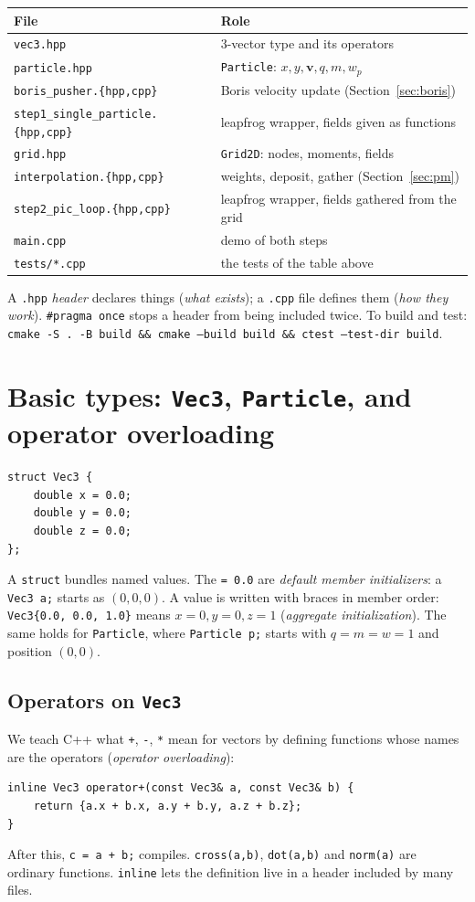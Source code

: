 \documentclass[11pt,a4paper]{article}
\newcommand{\vv}{\mathbf{v}}
\begin{document}
\begin{center}
\begin{tabular}{ll}
\toprule
File & Role \\
\midrule
\texttt{vec3.hpp} & 3-vector type and its operators\\
\texttt{particle.hpp} & \texttt{Particle}: $x,y,\vv,q,m,w_p$\\
\texttt{boris\_pusher.\{hpp,cpp\}} & Boris velocity update (Section~\ref{sec:boris})\\
\texttt{step1\_single\_particle.\{hpp,cpp\}} & leapfrog wrapper, fields given as functions\\
\texttt{grid.hpp} & \texttt{Grid2D}: nodes, moments, fields\\
\texttt{interpolation.\{hpp,cpp\}} & weights, deposit, gather (Section~\ref{sec:pm})\\
\texttt{step2\_pic\_loop.\{hpp,cpp\}} & leapfrog wrapper, fields gathered from the grid\\
\texttt{main.cpp} & demo of both steps\\
\texttt{tests/*.cpp} & the tests of the table above\\
\bottomrule
\end{tabular}
\end{center}
A \texttt{.hpp} \emph{header} declares things (\emph{what exists}); a \texttt{.cpp} file defines them
(\emph{how they work}). \lstinline|#pragma once| stops a header from being included twice.
To build and test: \texttt{cmake -S . -B build \&\& cmake --build build \&\& ctest --test-dir build}.

\section{Basic types: \texttt{Vec3}, \texttt{Particle}, and operator overloading}

\begin{lstlisting}
struct Vec3 {
    double x = 0.0;
    double y = 0.0;
    double z = 0.0;
};
\end{lstlisting}
A \texttt{struct} bundles named values. The \texttt{= 0.0} are \emph{default member initializers}: a
\lstinline|Vec3 a;| starts as $(0,0,0)$. A value is written with braces in member order:
\lstinline|Vec3{0.0, 0.0, 1.0}| means $x=0,y=0,z=1$ (\emph{aggregate initialization}). The same holds for
\texttt{Particle}, where \lstinline|Particle p;| starts with $q=m=w=1$ and position $(0,0)$.

\subsection{Operators on \texttt{Vec3}}
We teach C++ what \texttt{+}, \texttt{-}, \texttt{*} mean for vectors by defining functions whose names
are the operators (\emph{operator overloading}):
\begin{lstlisting}
inline Vec3 operator+(const Vec3& a, const Vec3& b) {
    return {a.x + b.x, a.y + b.y, a.z + b.z};
}
\end{lstlisting}
After this, \lstinline|c = a + b;| compiles. \texttt{cross(a,b)}, \texttt{dot(a,b)} and \texttt{norm(a)}
are ordinary functions. \lstinline|inline| lets the definition live in a header included by many files.
\end{document}
